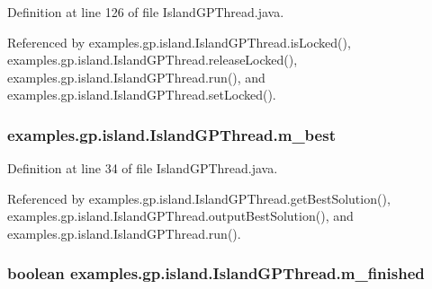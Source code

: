Definition at line 126 of file Island\-G\-P\-Thread.\-java.



Referenced by examples.\-gp.\-island.\-Island\-G\-P\-Thread.\-is\-Locked(), examples.\-gp.\-island.\-Island\-G\-P\-Thread.\-release\-Locked(), examples.\-gp.\-island.\-Island\-G\-P\-Thread.\-run(), and examples.\-gp.\-island.\-Island\-G\-P\-Thread.\-set\-Locked().

\hypertarget{classexamples_1_1gp_1_1island_1_1_island_g_p_thread_ad1b4d61ee4fd926f650df84b771939f7}{
\subsubsection[{m\-\_\-best}]{ examples.\-gp.\-island.\-Island\-G\-P\-Thread.\-m\-\_\-best\hspace{0.3cm}{\ttfamily [private]}}}\label{classexamples_1_1gp_1_1island_1_1_island_g_p_thread_ad1b4d61ee4fd926f650df84b771939f7}


Definition at line 34 of file Island\-G\-P\-Thread.\-java.



Referenced by examples.\-gp.\-island.\-Island\-G\-P\-Thread.\-get\-Best\-Solution(), examples.\-gp.\-island.\-Island\-G\-P\-Thread.\-output\-Best\-Solution(), and examples.\-gp.\-island.\-Island\-G\-P\-Thread.\-run().

\hypertarget{classexamples_1_1gp_1_1island_1_1_island_g_p_thread_a179aa1254667d3832d28b0593f29287d}{
\subsubsection[{m\-\_\-finished}]{\setlength{\rightskip}{0pt plus 5cm}boolean examples.\-gp.\-island.\-Island\-G\-P\-Thread.\-m\-\_\-finished\hspace{0.3cm}{\ttfamily [private]}}}\label{classexamples_1_1gp_1_1island_1_1_island_g_p_thread_a179aa1254667d3832d28b0593f29287d}


